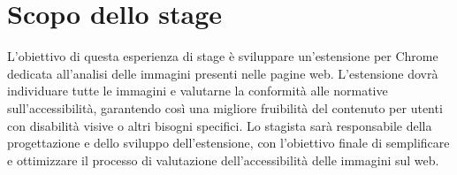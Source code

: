 \section*{Scopo dello stage}

L'obiettivo di questa esperienza di stage è sviluppare un'estensione per Chrome dedicata all'analisi delle immagini presenti nelle pagine web. L'estensione dovrà individuare tutte le immagini e valutarne la conformità alle normative sull'accessibilità, garantendo così una migliore fruibilità del contenuto per utenti con disabilità visive o altri bisogni specifici. Lo stagista sarà responsabile della progettazione e dello sviluppo dell'estensione, con l'obiettivo finale di semplificare e ottimizzare il processo di valutazione dell'accessibilità delle immagini sul web.